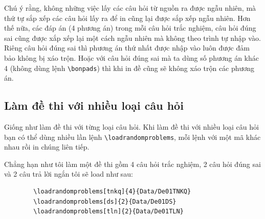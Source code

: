 	Chú ý rằng, không những việc lấy các câu hỏi từ nguồn ra được ngẫu nhiên, mà thứ tự sắp xếp các câu hỏi lấy ra để in cũng lại được sắp xếp ngẫu nhiên. Hơn thế nữa, các đáp án (4 phương án) trong mỗi câu hỏi trắc nghiệm, câu hỏi đúng sai cũng được xắp xếp lại một cách ngẫu nhiên mà không theo trình tự nhập vào. Riêng câu hỏi đúng sai thì phương án thứ nhất được nhập vào luôn được đảm bảo không bị xáo trộn. Hoặc với câu hỏi đúng sai mà ta dùng số phương án khác 4 (không dùng lệnh \verb'\bonpads') thì khi in đề cũng sẽ không xáo trộn các phương án.
	\subsection{Làm đề thi với nhiều loại câu hỏi}
	Giống như làm đề thi với từng loại câu hỏi. Khi làm đề thi với nhiều loại câu hỏi bạn có thể dùng nhiều lần lệnh \verb'\loadrandomproblems', mỗi lệnh với một mã khác nhau rồi in chúng liên tiếp.
	
	Chẳng hạn như tôi làm một đề thi gồm 4 câu hỏi trắc nghiệm, 2 câu hỏi đúng sai và 2 câu trả lời ngắn tôi sẽ load như sau:
	\begin{verbatim}
		\loadrandomproblems[tnkq]{4}{Data/De01TNKQ}
		\loadrandomproblems[ds]{2}{Data/De01DS}
		\loadrandomproblems[tln]{2}{Data/De01TLN}
	\end{verbatim}
	
